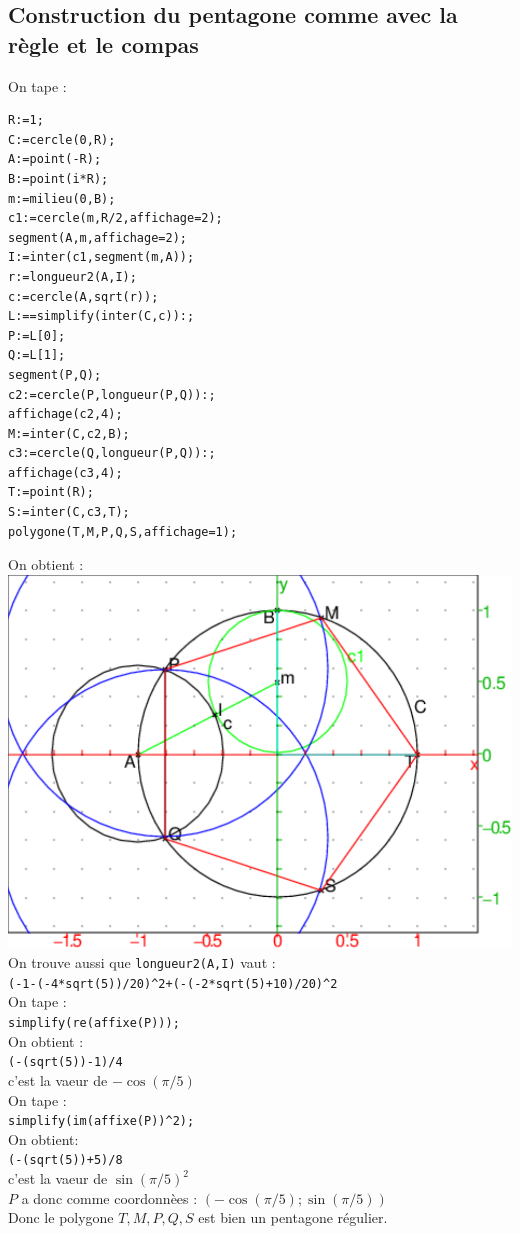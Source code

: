 \documentclass[a4paper,11pt]{book}
\begin{document}
\subsection{Construction du pentagone comme avec la r\`egle et le compas}
On tape :
\begin{verbatim}
R:=1;
C:=cercle(0,R);
A:=point(-R);
B:=point(i*R);
m:=milieu(0,B);
c1:=cercle(m,R/2,affichage=2);
segment(A,m,affichage=2);
I:=inter(c1,segment(m,A));
r:=longueur2(A,I);
c:=cercle(A,sqrt(r));
L:==simplify(inter(C,c)):;
P:=L[0];
Q:=L[1];
segment(P,Q);
c2:=cercle(P,longueur(P,Q)):;
affichage(c2,4);
M:=inter(C,c2,B);
c3:=cercle(Q,longueur(P,Q)):;
affichage(c3,4);
T:=point(R);
S:=inter(C,c3,T);
polygone(T,M,P,Q,S,affichage=1);
\end{verbatim}
On obtient :\\
\includegraphics[width=\textwidth]{penta1}\\
On trouve aussi que {\tt longueur2(A,I)} vaut :\\
{\tt (-1-(-4*sqrt(5))/20)\verb|^|2+(-(-2*sqrt(5)+10)/20)\verb|^|2}\\
On tape :\\
{\tt simplify(re(affixe(P)));}\\
On obtient :\\
{\tt (-(sqrt(5))-1)/4}\\
c'est la vaeur de $-\cos(\pi/5)$\\
On tape :\\
{\tt simplify(im(affixe(P))\verb|^|2);}\\
On obtient:\\
{\tt (-(sqrt(5))+5)/8}\\
c'est la vaeur de $\sin(\pi/5)^2$\\
$P$ a donc comme coordonn\`ees : $(-\cos(\pi/5);\sin(\pi/5))$\\
Donc le polygone $T,M,P,Q,S$ est bien un pentagone r\'egulier.
\end{document}
